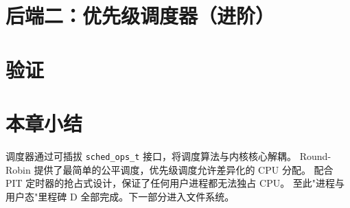 \section{后端二：优先级调度器（进阶）}
\label{sec:sched-priority}


\section{验证}
\label{sec:sched-verify}


\section{本章小结}

调度器通过可插拔 \texttt{sched\_ops\_t} 接口，将调度算法与内核核心解耦。
Round-Robin 提供了最简单的公平调度，优先级调度允许差异化的 CPU 分配。
配合 PIT 定时器的抢占式设计，保证了任何用户进程都无法独占 CPU。
至此"进程与用户态"里程碑 D 全部完成。下一部分进入文件系统。
